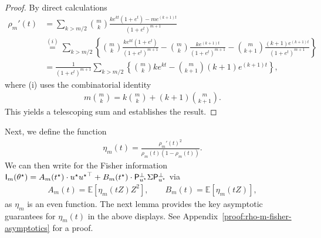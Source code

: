 \documentclass[11pt]{article}
\newcommand{\E}{\mathbb{E}}
\newcommand{\brk}[1]{\left[{#1}\right]} %
\newcommand{\proj}{\mathsf{P}}
\newcommand{\<}{\langle} %
\renewcommand{\>}{\rangle}
\newcommand{\opt}{^\star}
\begin{document}
\begin{proof}
	By direct calculations
	\begin{align*}
		\rho_m'(t) &  = \sum_{k > m/2} \binom{m}{k} \frac{ke^{kt} (1+e^t) - me^{(k+1)t}}{(1+e^t)^{m+1}} \\
		&  \stackrel{(i)}{=} \sum_{k > m/2} \left\{  \binom{m}{k} \frac{ke^{kt}(1+e^t)}{(1+e^t)^{m+1}} - \binom{m}{k} \frac{ke^{(k+1)t}}{(1+e^t)^{m+1}} - \binom{m}{k+1} \frac{(k+1)e^{(k+1)t}}{(1+e^t)^{m+1}} \right\} \nonumber \\
		& = \frac{1}{(1+e^t)^{m+1}}\sum_{k > m/2} \left\{ \binom{m}{k} ke^{kt} - \binom{m}{k+1} (k+1)e^{(k+1)t}\right\}, 
	\end{align*}
	where (i) uses the combinatorial identity
	\begin{align*}
		m \binom{m}{k} = k \binom{m}{k} + (k+1)\binom{m}{k+1}.
	\end{align*}
	This yields a telescoping sum and establishes the result.
\end{proof}
Next,  we define the function
\begin{align*}
	\eta_m(t) = \frac{\rho_m'(t)^2}{\rho_m(t)(1-\rho_m(t))}.
\end{align*}
We can then write for the Fisher information $\fisher_m(\theta\opt) = A_m (t\opt) \cdot u\opt {u\opt}^\top +   B_m (t\opt) \cdot \proj_{u\opt}^\perp \Sigma \proj_{u\opt}^\perp $ via
\begin{align*}
	A_m(t) = \E \brk{\eta_m(tZ)Z^2}, \qquad B_m(t) = \E \brk{\eta_m(tZ)},
\end{align*}
as $\eta_m$ is an even function. The next lemma provides the key asymptotic
guarantees for $\eta_m(t)$ in the above displays. See
Appendix~\ref{proof:rho-m-fisher-asymptotics} for a proof.
\end{document}
